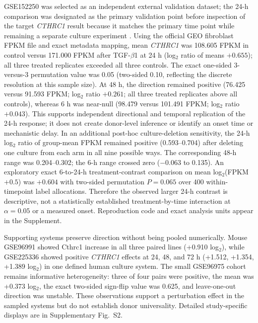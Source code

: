 \documentclass[preprint,11pt]{elsarticle}
\newcommand{\cthrc}{\textit{CTHRC1}}
\newcommand{\tgfb}{TGF-$\beta$1}
\begin{document}
GSE152250 was selected as an independent external validation dataset; the 24-h comparison was designated as the primary validation point before inspection of the target \cthrc{} result because it matches the primary time point while remaining a separate culture experiment \cite{Zhang2020}. Using the official GEO fibroblast FPKM file and exact metadata mapping, mean \cthrc{} was 108.605 FPKM in control versus 171.000 FPKM after \tgfb{} at 24 h (log$_2$ ratio of means $+0.655$); all three treated replicates exceeded all three controls. The exact one-sided 3-versus-3 permutation value was 0.05 (two-sided 0.10, reflecting the discrete resolution at this sample size). At 48 h, the direction remained positive (76.425 versus 91.593 FPKM; log$_2$ ratio $+0.261$; all three treated replicates above all controls), whereas 6 h was near-null (98.479 versus 101.491 FPKM; log$_2$ ratio $+0.043$). This supports independent directional and temporal replication of the 24-h response; it does not create donor-level inference or identify an onset time or mechanistic delay. In an additional post-hoc culture-deletion sensitivity, the 24-h log$_2$ ratio of group-mean FPKM remained positive (0.593--0.704) after deleting one culture from each arm in all nine possible ways. The corresponding 48-h range was 0.204--0.302; the 6-h range crossed zero ($-0.063$ to 0.135). An exploratory exact 6-to-24-h treatment-contrast comparison on mean log$_2$(FPKM$+0.5$) was $+0.604$ with two-sided permutation $P=0.065$ over 400 within-timepoint label allocations. Therefore the observed larger 24-h contrast is descriptive, not a statistically established treatment-by-time interaction at $\alpha=0.05$ or a measured onset. Reproduction code and exact analysis units appear in the Supplement.

Supporting systems preserve direction without being pooled numerically. Mouse GSE96991 showed Cthrc1 increase in all three paired lines (+0.910 log$_2$), while GSE225336 showed positive \cthrc{} effects at 24, 48, and 72 h (+1.512, +1.354, +1.389 log$_2$) in one defined human culture system. The small GSE96975 cohort remains informative heterogeneity: three of four pairs were positive, the mean was +0.373 log$_2$, the exact two-sided sign-flip value was 0.625, and leave-one-out direction was unstable. These observations support a perturbation effect in the sampled systems but do not establish donor universality. Detailed study-specific displays are in Supplementary Fig.~S2.
\end{document}

